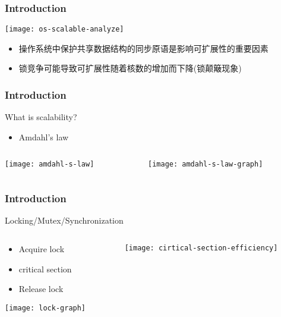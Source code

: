 \begin{frame}[plain]	
	\frametitle{Introduction}

	\texttt{[image: os-scalable-analyze]}
	\begin{itemize}
		\item 操作系统中保护共享数据结构的同步原语是影响可扩展性的重要因素 
		\item 锁竞争可能导致可扩展性随着核数的增加而下降(锁颠簸现象)
	\end{itemize}
\end{frame}

\begin{frame}[plain]	
	\frametitle{Introduction}
	\Large \centering
	What is scalability? 
	\begin{itemize}
		\item Amdahl’s law
	\end{itemize}
	
	\begin{columns}
		
		\begin{column}{.5\textwidth}
			\texttt{[image: amdahl-s-law]}
		\end{column}
		\begin{column}{.5\textwidth}
			\texttt{[image: amdahl-s-law-graph]}
		\end{column}
	\end{columns}
\end{frame}



\begin{frame}[plain]	
	\frametitle{Introduction}
	\Large \centering
	Locking/Mutex/Synchronization 

	
	\begin{columns}
		
		\begin{column}{.5\textwidth}
				\begin{itemize}
				\item Acquire lock
				\item critical section
				\item Release lock
			\end{itemize}
			\texttt{[image: lock-graph]}
		\end{column}
		\begin{column}{.5\textwidth}
			\texttt{[image: cirtical-section-efficiency]}
		\end{column}
	\end{columns}
\end{frame}


